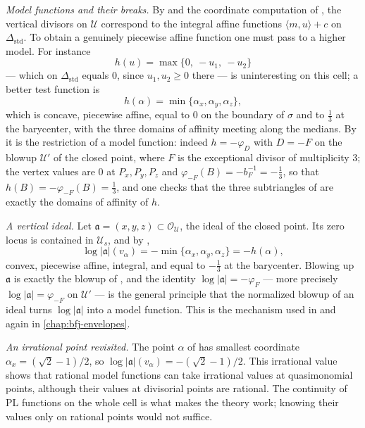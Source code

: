 \begin{example}
\emph{Model functions and their breaks.} By
 and the coordinate computation of
, the vertical divisors on $\mathcal U$
correspond to the integral affine functions $\langle m,u\rangle+c$ on
$\Delta_{\mathrm{std}}$. To obtain a genuinely piecewise affine function
one must pass to a higher model. For instance
\[
 h(u)=\max\{0,\ -u_1,\ -u_2\}
\]
--- which on $\Delta_{\mathrm{std}}$ equals $0$, since
$u_1,u_2\ge0$ there --- is uninteresting on this cell; a better test
function is
\[
 h(\alpha)=\min\{\alpha_x,\alpha_y,\alpha_z\},
\]
which is concave, piecewise affine, equal to $0$ on the boundary of
$\sigma$ and to $\tfrac13$ at the barycenter, with the three domains of
affinity meeting along the medians. By
 it is the restriction of a model
function: indeed $h=-\varphi_{D}$ with $D=-F$ on the blowup
$\mathcal U'$ of the closed point, where $F$ is the exceptional divisor
of multiplicity $3$; the vertex values are $0$ at $P_x,P_y,P_z$ and
$\varphi_{-F}(B)=-b_F^{-1}=-\tfrac13$, so that
$h(B)=-\varphi_{-F}(B)=\tfrac13$, and one checks that the three
subtriangles of  are exactly the domains of
affinity of $h$.

\emph{A vertical ideal.} Let $\mathfrak a=(x,y,z)\subset
\mathcal O_{\mathcal U}$, the ideal of the closed point. Its zero locus is
contained in $\mathcal U_s$, and by
,
\[
 \log|\mathfrak a|(v_\alpha)
 =-\min\{\alpha_x,\alpha_y,\alpha_z\}=-h(\alpha),
\]
convex, piecewise affine, integral, and equal to $-\tfrac13$ at the
barycenter. Blowing up $\mathfrak a$ is exactly the blowup of
, and the identity $\log|\mathfrak a|
=-\varphi_F$ --- more precisely $\log|\mathfrak a|=\varphi_{-F}$ on
$\mathcal U'$ --- is the general principle that the normalized blowup of
an ideal turns $\log|\mathfrak a|$ into a model function. This is the
mechanism used in  and again in
\cref{chap:bfj-envelopes}.

\emph{An irrational point revisited.} The point $\alpha$ of
 has smallest coordinate
$\alpha_x=(\sqrt2-1)/2$, so
$\log|\mathfrak a|(v_\alpha)=-(\sqrt2-1)/2$. This irrational value shows
that rational model functions can take irrational values at quasimonomial
points, although their values at divisorial points are rational. The
continuity of PL functions on the whole cell is what makes the theory work;
knowing their values only on rational points would not suffice.
\end{example}

